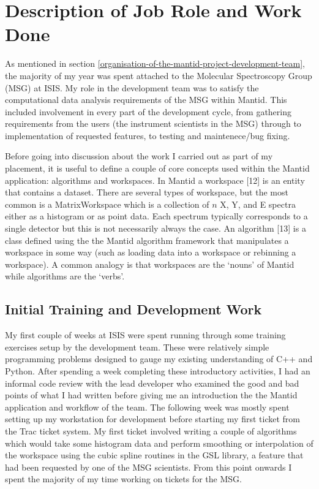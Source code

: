 \documentclass[paper=a4, fontsize=11pt]{scrartcl}	%
\numberwithin{equation}{section}															%
\numberwithin{figure}{section}																%
\numberwithin{table}{section}
\begin{document}
\section{Description of Job Role and Work
Done}\label{description-of-job-role-and-work-done}

As mentioned in section \ref{organisation-of-the-mantid-project-development-team}, the
majority of my year was spent attached to the Molecular Spectroscopy
Group (MSG) at ISIS. My role in the development team was to satisfy the
computational data analysis requirements of the MSG within Mantid. This
included involvement in every part of the development cycle, from
gathering requirements from the users (the instrument scientists in the
MSG) through to implementation of requested features, to testing and
maintenece/bug fixing.

Before going into discussion about the work I carried out as part of my
placement, it is useful to define a couple of core concepts used within
the Mantid application: algorithms and workspaces. In Mantid a workspace
{[}12{]} is an entity that contains a dataset. There are several types
of workspace, but the most common is a MatrixWorkspace which is a
collection of $n$ X, Y, and E spectra either as a histogram or as point
data. Each spectrum typically corresponds to a single detector but this is
not necessarily always the case. An algorithm {[}13{]} is a class
defined using the the Mantid algorithm framework that manipulates a
workspace in some way (such as loading data into a workspace or
rebinning a workspace). A common analogy is that workspaces are the
`nouns' of Mantid while algorithms are the `verbs'.

\subsection{Initial Training and Development
Work}\label{initial-training-and-development-work}

My first couple of weeks at ISIS were spent running through some
training exercises setup by the development team. These were relatively
simple programming problems designed to gauge my existing understanding
of C++ and Python. After spending a week completing these introductory
activities, I had an informal code review with the lead developer who
examined the good and bad points of what I had written before giving me
an introduction the the Mantid application and workflow of the team. The
following week was mostly spent setting up my workstation for
development before starting my first ticket from the Trac ticket system.
My first ticket involved writing a couple of algorithms which would take
some histogram data and perform smoothing or interpolation of the
workspace using the cubic spline routines in the GSL library, a feature
that had been requested by one of the MSG scientists. From this point
onwards I spent the majority of my time working on tickets for the MSG.
\end{document}
